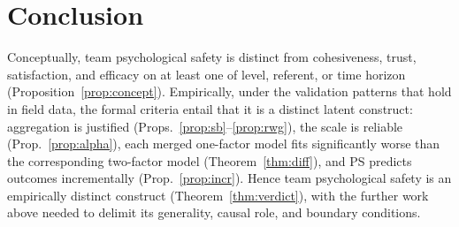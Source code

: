 \documentclass{amsart}
\theoremstyle{remark}
\begin{document}
\section*{Conclusion}
Conceptually, team psychological safety is distinct from cohesiveness, trust,
satisfaction, and efficacy on at least one of level, referent, or time horizon
(Proposition~\ref{prop:concept}). Empirically, under the validation patterns that
hold in field data, the formal criteria entail that it is a distinct latent
construct: aggregation is justified (Props.~\ref{prop:sb}--\ref{prop:rwg}), the
scale is reliable (Prop.~\ref{prop:alpha}), each merged one-factor model fits
significantly worse than the corresponding two-factor model
(Theorem~\ref{thm:diff}), and PS predicts outcomes incrementally
(Prop.~\ref{prop:incr}). Hence team psychological safety is an empirically distinct
construct (Theorem~\ref{thm:verdict}), with the further work above needed to
delimit its generality, causal role, and boundary conditions.
\end{document}
